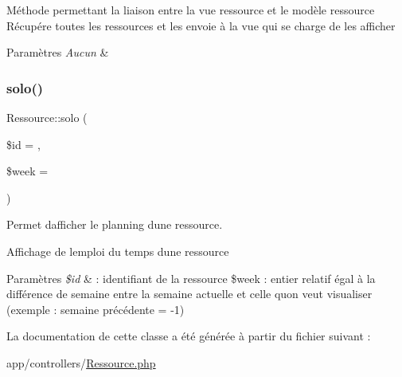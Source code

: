 Méthode permettant la liaison entre la vue ressource et le modèle ressource Récupére toutes les ressources et les envoie à la vue qui se charge de les afficher 
\begin{DoxyParams}{Paramètres}
{\em Aucun} & \\
\hline
\end{DoxyParams}
\mbox{\label{class_ressource_a99f3c4dbb84bda87a8d2ab092600437a}} 
\subsubsection{\texorpdfstring{solo()}{solo()}}
{\footnotesize\ttfamily Ressource\+::solo (\begin{DoxyParamCaption}\item[{}]{\$id = {},  }\item[{}]{\$week = {} }\end{DoxyParamCaption})}



Permet d\textquotesingle{}afficher le planning d\textquotesingle{}une ressource. 

Affichage de l\textquotesingle{}emploi du temps d\textquotesingle{}une ressource 
\begin{DoxyParams}{Paramètres}
{\em \$id} & \+: identifiant de la ressource \$week \+: entier relatif égal à la différence de semaine entre la semaine actuelle et celle qu\textquotesingle{}on veut visualiser (exemple \+: semaine précédente = -\/1) \\
\hline
\end{DoxyParams}


La documentation de cette classe a été générée à partir du fichier suivant \+:\begin{DoxyCompactItemize}
\item 
app/controllers/\hyperlink{_ressource_8php}{Ressource.\+php}\end{DoxyCompactItemize}
